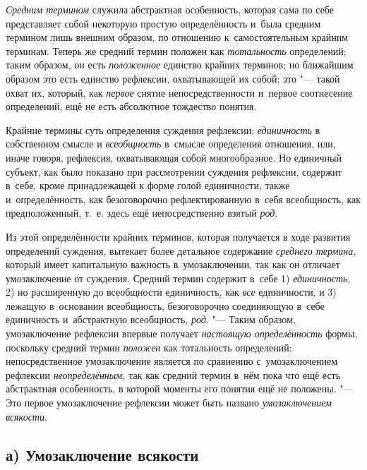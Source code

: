 {\em Средним термином}
служила абстрактная особенность, которая сама по себе
представляет собой некоторую простую определённость и~была средним термином
лишь внешним образом, по отношению к~самостоятельным крайним терминам.
Теперь же средний термин положен как
{\em тотальность}
определений; таким образом, он есть
{\em положенное} единство
крайних терминов; но ближайшим образом это есть единство рефлексии,
охватывающей их собой; это "--- такой охват их, который, как
{\em первое} снятие
непосредственности и~первое соотнесение определений, ещё не есть абсолютное
тождество понятия.

Крайние термины суть определения суждения рефлексии:
{\em единичность} в
собственном смысле и {\em всеобщность}
в~смысле определения отношения, или, иначе говоря, рефлексия,
охватывающая собой многообразное. Но единичный субъект, как было показано
при рассмотрении суждения рефлексии, содержит в~себе, кроме принадлежащей к
форме голой единичности, также и~определённость, как безоговорочно
рефлектированную в~себя всеобщность, как предположенный, т.~е. здесь ещё
непосредственно взятый {\em род}.

Из этой определённости крайних терминов, которая получается в
ходе развития определений суждения, вытекает более детальное содержание
{\em среднего термина,}
который имеет капитальную важность в~умозаключении, так как
он отличает умозаключение от суждения. Средний термин содержит в~себе 1)
{\em единичность,} 2) но
расширенную до всеобщности единичность, как
{\em все} единичности, и
3) лежащую в~основании всеобщность, безоговорочно соединяющую в~себе
единичность и~абстрактную всеобщность,
{\em род}. "--- Таким
образом, умозаключение рефлексии впервые получает
{\em настоящую определённость}
формы, поскольку средний термин
{\em положен} как
тотальность определений; непосредственное умозаключение является
по сравнению с~умозаключением рефлексии
{\em неопределённым,} так
как средний термин в~нём пока что ещё есть абстрактная особенность, в
которой моменты его понятия ещё не положены. "--- Это первое
умозаключение рефлексии может быть названо
{\em умозаключением
всякости}.

\subsection[а) Умозаключение всякости]{а) Умозаключение всякости}

